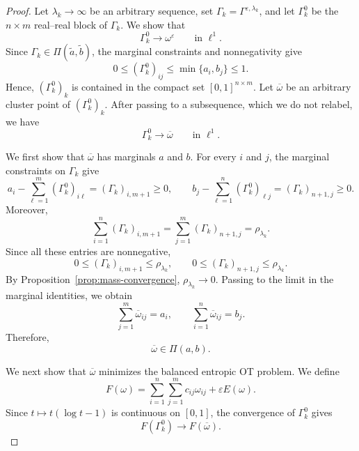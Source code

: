 \documentclass[a4paper,11pt]{article}
\numberwithin{equation}{section}
\newcommand{\eps}{\varepsilon}
\begin{document}
\begin{proof}
Let $\lambda_k\to\infty$ be an arbitrary sequence, set $\Gamma_k=\Gamma^{\eps,\lambda_k}$, and let $\Gamma_k^0$ be the $n\times m$ real--real block of $\Gamma_k$. We show that
\begin{equation*}
  \Gamma_k^0\to\omega^\eps
  \qquad\text{in }\ell^1.
\end{equation*}
Since $\Gamma_k\in\Pi(\widetilde a,\widetilde b)$, the marginal constraints and nonnegativity give
\begin{equation*}
  0\leq(\Gamma_k^0)_{ij}\leq\min\{a_i,b_j\}\leq1.
\end{equation*}
Hence, $(\Gamma_k^0)_k$ is contained in the compact set $[0,1]^{n\times m}$. Let $\overline\omega$ be an arbitrary cluster point of $(\Gamma_k^0)_k$. After passing to a subsequence, which we do not relabel, we have
\begin{equation*}
  \Gamma_k^0\to\overline\omega
  \qquad\text{in }\ell^1.
\end{equation*}

We first show that $\overline\omega$ has marginals $a$ and $b$. For every $i$ and $j$, the marginal constraints on $\Gamma_k$ give
\begin{equation*}
  a_i-\sum_{\ell=1}^{m}(\Gamma_k^0)_{i\ell}=(\Gamma_k)_{i,m+1}\geq0,\qquad b_j-\sum_{\ell=1}^{n}(\Gamma_k^0)_{\ell j}=(\Gamma_k)_{n+1,j}\geq0.
\end{equation*}
Moreover,
\begin{equation*}
  \sum_{i=1}^{n}(\Gamma_k)_{i,m+1}=\sum_{j=1}^{m}(\Gamma_k)_{n+1,j}=\rho_{\lambda_k}.
\end{equation*}
Since all these entries are nonnegative,
\begin{equation*}
  0\leq(\Gamma_k)_{i,m+1}\leq\rho_{\lambda_k},
  \qquad
  0\leq(\Gamma_k)_{n+1,j}\leq\rho_{\lambda_k}.
\end{equation*}
By Proposition~\ref{prop:mass-convergence}, $\rho_{\lambda_k}\to0$. Passing to the limit in the marginal identities, we obtain
\begin{equation*}
  \sum_{j=1}^{m}\overline\omega_{ij}=a_i,
  \qquad
  \sum_{i=1}^{n}\overline\omega_{ij}=b_j.
\end{equation*}
Therefore,
\begin{equation*}
  \overline\omega\in\Pi(a,b).
\end{equation*}

We next show that $\overline\omega$ minimizes the balanced entropic OT problem. We define
\begin{equation*}
  F(\omega)=\sum_{i=1}^{n}\sum_{j=1}^{m}c_{ij}\omega_{ij}+\eps E(\omega).
\end{equation*}
Since $t\mapsto t(\log t-1)$ is continuous on $[0,1]$, the convergence of $\Gamma_k^0$ gives
\begin{equation*}
  F(\Gamma_k^0)\to F(\overline\omega).
\end{equation*}


\end{proof}
\end{document}
